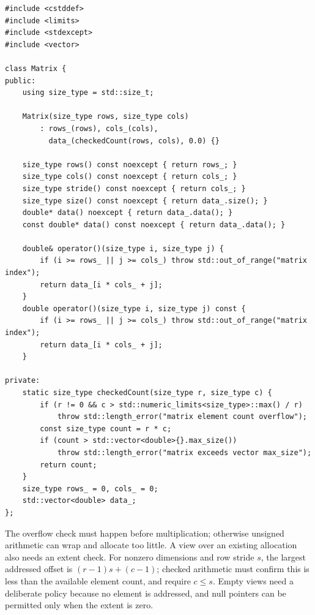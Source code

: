 \begin{verbatim}
#include <cstddef>
#include <limits>
#include <stdexcept>
#include <vector>

class Matrix {
public:
    using size_type = std::size_t;

    Matrix(size_type rows, size_type cols)
        : rows_(rows), cols_(cols),
          data_(checkedCount(rows, cols), 0.0) {}

    size_type rows() const noexcept { return rows_; }
    size_type cols() const noexcept { return cols_; }
    size_type stride() const noexcept { return cols_; }
    size_type size() const noexcept { return data_.size(); }
    double* data() noexcept { return data_.data(); }
    const double* data() const noexcept { return data_.data(); }

    double& operator()(size_type i, size_type j) {
        if (i >= rows_ || j >= cols_) throw std::out_of_range("matrix index");
        return data_[i * cols_ + j];
    }
    double operator()(size_type i, size_type j) const {
        if (i >= rows_ || j >= cols_) throw std::out_of_range("matrix index");
        return data_[i * cols_ + j];
    }

private:
    static size_type checkedCount(size_type r, size_type c) {
        if (r != 0 && c > std::numeric_limits<size_type>::max() / r)
            throw std::length_error("matrix element count overflow");
        const size_type count = r * c;
        if (count > std::vector<double>{}.max_size())
            throw std::length_error("matrix exceeds vector max_size");
        return count;
    }
    size_type rows_ = 0, cols_ = 0;
    std::vector<double> data_;
};
\end{verbatim}

The overflow check must happen before multiplication; otherwise unsigned arithmetic can wrap and allocate too little. A view over an existing allocation also needs an extent check. For nonzero dimensions and row stride \(s\), the largest addressed offset is \((r-1)s+(c-1)\); checked arithmetic must confirm this is less than the available element count, and require \(c\le s\). Empty views need a deliberate policy because no element is addressed, and null pointers can be permitted only when the extent is zero.

